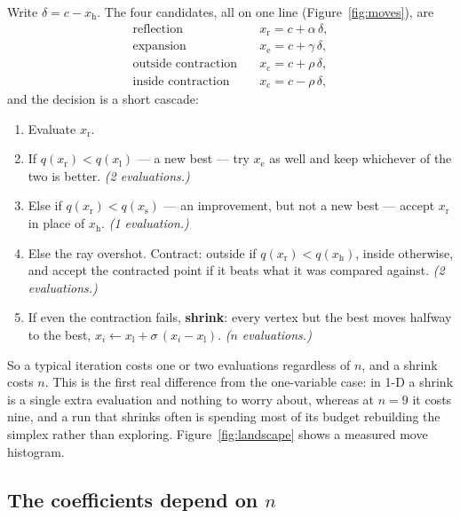 \documentclass[11pt,a4paper]{article}
\newcommand{\xh}{x_{\mathrm{h}}}
\newcommand{\xl}{x_{\mathrm{l}}}
\newcommand{\xs}{x_{\mathrm{s}}}
\newcommand{\xr}{x_{\mathrm{r}}}
\newcommand{\xe}{x_{\mathrm{e}}}
\newcommand{\xc}{x_{\mathrm{c}}}
\begin{document}
Write $\delta=c-\xh$.  The four candidates, all on one line
(Figure~\ref{fig:moves}), are
\begin{align}
  \text{reflection}         &\quad \xr=c+\alpha\,\delta, \\
  \text{expansion}          &\quad \xe=c+\gamma\,\delta, \\
  \text{outside contraction}&\quad \xc=c+\rho\,\delta, \\
  \text{inside contraction} &\quad \xc=c-\rho\,\delta,
\end{align}
and the decision is a short cascade:
\begin{enumerate}
\item Evaluate $\xr$.
\item If $q(\xr)<q(\xl)$ --- a new best --- try $\xe$ as well and keep
  whichever of the two is better.  \emph{(2 evaluations.)}
\item Else if $q(\xr)<q(\xs)$ --- an improvement, but not a new best ---
  accept $\xr$ in place of $\xh$.  \emph{(1 evaluation.)}
\item Else the ray overshot.  Contract: outside if $q(\xr)<q(\xh)$, inside
  otherwise, and accept the contracted point if it beats what it was compared
  against.  \emph{(2 evaluations.)}
\item If even the contraction fails, \textbf{shrink}: every vertex but the
  best moves halfway to the best,
  $x_i\leftarrow \xl+\sigma\,(x_i-\xl)$.  \emph{($n$ evaluations.)}
\end{enumerate}

So a typical iteration costs one or two evaluations regardless of $n$, and a
shrink costs $n$.  This is the first real difference from the one-variable
case: in 1-D a shrink is a single extra evaluation and nothing to worry
about, whereas at $n=9$ it costs nine, and a run that shrinks often is
spending most of its budget rebuilding the simplex rather than exploring.
Figure~\ref{fig:landscape} shows a measured move histogram.

\subsection{The coefficients depend on $n$}
\end{document}
